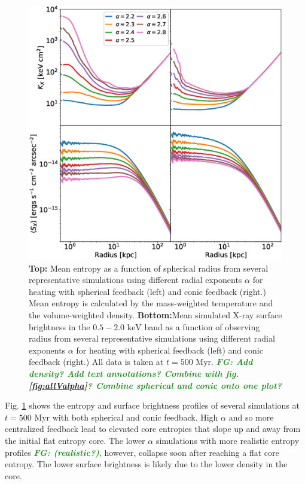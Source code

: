 \documentclass[iop,apjl, twocolappendix]{emulateapj}   %
\def\FG#1{{\textcolor{ForestGreen}{\textbf{\textit{ FG: #1}}}}}
\begin{document}
\begin{figure}
	\begin{center}
		\includegraphics[width=1\linewidth]{figures/allVradius.eps}
	\end{center}
	\caption{
    \label{fig:allVradius}
    \textbf{Top:} Mean entropy as a function of spherical radius from
    several representative simulations using different radial exponents
    $\alpha$ for heating with spherical feedback (left) and conic feedback
    (right.) Mean entropy is calculated by the mass-weighted temperature and the
    volume-weighted density.
    \textbf{Bottom:}Mean simulated X-ray surface brightness in the $0.5 -2.0
    \text{ keV}$ band as a function of observing radius from several
    representative simulations using different radial exponents $\alpha$ for
    heating with spherical feedback (left) and conic feedback (right.) All data
    is taken at $t= 500 \text{ Myr}$. \FG{Add density? Add text annotations?
    Combine with fig. \ref{fig:allValpha}? Combine spherical and conic onto one
    plot?}
  }
\end{figure}

Fig. \ref{fig:allVradius} shows the entropy and surface brightness profiles of
several simulations at $t=500 \text{ Myr}$ with both spherical and conic
feedback. High $\alpha$ and so more centralized feedback lead to elevated core
entropies that slope up and away from the initial flat entropy core. The lower
$\alpha$ simulations with more realistic entropy profiles \FG{(realistic?)},
however, collapse soon after reaching a flat core entropy. The lower surface
brightness is likely due to the lower density in the core.
\end{document}
